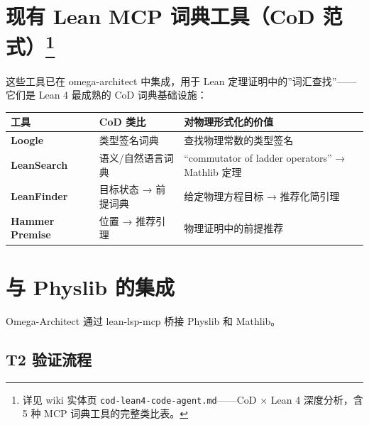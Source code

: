 \documentclass[
  11pt,
  a4paper,
]{ctexrep}
\newcounter{none} %
\begin{document}
\section[现有 Lean MCP 词典工具（CoD 范式）]{\texorpdfstring{现有 Lean
MCP 词典工具（CoD
范式）\footnote{详见 wiki 实体页
  \texttt{cod-lean4-code-agent.md}------CoD × Lean 4 深度分析，含 5 种
  MCP 词典工具的完整类比表。}}{现有 Lean MCP 词典工具（CoD 范式）}}\label{ux73b0ux6709-lean-mcp-ux8bcdux5178ux5de5ux5177cod-ux8303ux5f0fcod-lean}

这些工具已在 omega-architect 中集成，用于 Lean
定理证明中的''词汇查找''------它们是 Lean 4 最成熟的 CoD 词典基础设施：

{\def\LTcaptype{none} %
\begin{longtable}[]{@{}
  >{\raggedright\arraybackslash}p{}
  >{\raggedright\arraybackslash}p{}
  >{\raggedright\arraybackslash}p{}@{}}
\toprule\noalign{}
\begin{minipage}[b]{\linewidth}\raggedright
工具
\end{minipage} & \begin{minipage}[b]{\linewidth}\raggedright
CoD 类比
\end{minipage} & \begin{minipage}[b]{\linewidth}\raggedright
对物理形式化的价值
\end{minipage} \\
\midrule\noalign{}
\endhead
\bottomrule\noalign{}
\endlastfoot
\textbf{Loogle} & 类型签名词典 & 查找物理常数的类型签名 \\
\textbf{LeanSearch} & 语义/自然语言词典 & ``commutator of ladder
operators'' → Mathlib 定理 \\
\textbf{LeanFinder} & 目标状态 → 前提词典 & 给定物理方程目标 →
推荐化简引理 \\
\textbf{Hammer Premise} & 位置 → 推荐引理 & 物理证明中的前提推荐 \\
\end{longtable}
}

\section{与 Physlib 的集成}\label{ux4e0e-physlib-ux7684ux96c6ux6210}

Omega-Architect 通过 lean-lsp-mcp 桥接 Physlib 和 Mathlib。

\subsection{T2 验证流程}\label{t2-ux9a8cux8bc1ux6d41ux7a0b}
\end{document}
